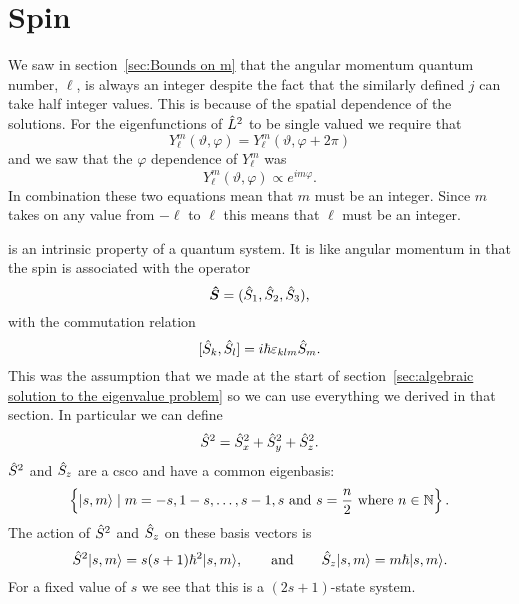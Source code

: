\section{Spin}
We saw in section~\ref{sec:Bounds on m} that the angular momentum quantum number, \(\ell\), is always an integer despite the fact that the similarly defined \(j\) can take half integer values.
This is because of the spatial dependence of the solutions.
For the eigenfunctions of \(\hat{L}^2\) to be single valued we require that
\[Y_\ell^m(\vartheta, \varphi) = Y_\ell^m(\vartheta, \varphi + 2\pi)\]
and we saw that the \(\varphi\) dependence of \(Y_\ell^m\) was
\[Y_\ell^m(\vartheta, \varphi) \propto e^{im\varphi}.\]
In combination these two equations mean that \(m\) must be an integer.
Since \(m\) takes on any value from \(-\ell\) to \(\ell\) this means that \(\ell\) must be an integer.

 is an intrinsic property of a quantum system.
It is like angular momentum in that the spin is associated with the operator
\[\bm{\hat{S}} = (\hat{S}_1, \hat{S}_2, \hat{S}_3),\]
with the commutation relation
\[[\hat{S}_k, \hat{S}_l] = i\hbar\varepsilon_{klm}\hat{S}_m.\]
This was the assumption that we made at the start of section~\ref{sec:algebraic solution to the eigenvalue problem} so we can use everything we derived in that section.
In particular we can define 
\[\hat{S}^2 = \hat{S}_x^2 + \hat{S}_y^2 + \hat{S}_z^2.\]
\(\hat{S}^2\) and \(\hat{S}_z\) are a \gls{csco} and have a common eigenbasis:
\[\left\{\vert {s, m} \rangle\mid m = -s, 1 - s, \dotsc, s - 1, s~\text{and}~s = \frac{n}{2}~\text{where}~n\in\mathbb{N}\right\}.\]
The action of \(\hat{S}^2\) and \(\hat{S}_z\) on these basis vectors is
\[\hat{S}^2\vert {s, m} \rangle = s(s + 1)\hbar^2\vert {s, m} \rangle, \qquad\text{and}\qquad \hat{S}_z\vert {s, m} \rangle = m\hbar\vert {s, m} \rangle.\]
For a fixed value of \(s\) we see that this is a \((2s + 1)\)-state system.

